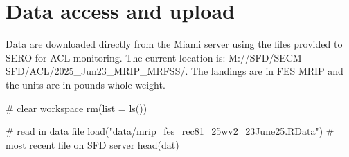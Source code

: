 \documentclass[
  letterpaper,
  oneside,
  open=any]{scrbook}
\newenvironment{Shaded}{\begin{snugshade}}{\end{snugshade}}
\newcommand{\AttributeTok}[1]{\textcolor[rgb]{0.40,0.45,0.13}{#1}}
\newcommand{\CommentTok}[1]{\textcolor[rgb]{0.37,0.37,0.37}{#1}}
\newcommand{\FunctionTok}[1]{\textcolor[rgb]{0.28,0.35,0.67}{#1}}
\newcommand{\NormalTok}[1]{\textcolor[rgb]{0.00,0.23,0.31}{#1}}
\newcommand{\StringTok}[1]{\textcolor[rgb]{0.13,0.47,0.30}{#1}}
\begin{document}
\section{Data access and upload}\label{data-access-and-upload}

Data are downloaded directly from the Miami server using the files
provided to SERO for ACL monitoring. The current location is:
M://SFD/SECM-SFD/ACL/2025\_Jun23\_MRIP\_MRFSS/. The landings are in FES
MRIP and the units are in pounds whole weight.

\begin{Shaded}
\begin{Highlighting}[]
\CommentTok{\# clear workspace}
\FunctionTok{rm}\NormalTok{(}\AttributeTok{list =} \FunctionTok{ls}\NormalTok{())}

\CommentTok{\# read in data file}
\FunctionTok{load}\NormalTok{(}\StringTok{"data/mrip\_fes\_rec81\_25wv2\_23June25.RData"}\NormalTok{)  }\CommentTok{\# most recent file on SFD server}
\FunctionTok{head}\NormalTok{(dat)}
\end{Highlighting}
\end{Shaded}
\end{document}
